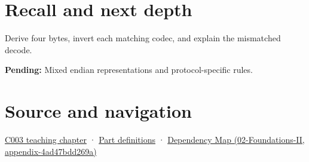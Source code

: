 \section{Recall and next depth}\label{appendix-bc07c3d25b18-recall-and-next-depth}

Derive four bytes, invert each matching codec, and explain the mismatched decode.

\textbf{Pending:} Mixed endian representations and protocol-specific rules.

\section{Source and navigation}\label{appendix-bc07c3d25b18-source-and-navigation}

\href{Continuous\%20Notes/Computing\%20Foundations\%20-\%20From\%20Bits\%20to\%20C++\%20and\%20Systems\%20APIs\#Where\%20the\%20bytes\%20live}{C003 teaching chapter} · \hyperref[appendix-fd090d982a15-m003---parts-41-60]{Part definitions} · \href{../02-Foundations-II/main.pdf\#nameddest=appendix-4ad47bdd269a}{Dependency Map (02-Foundations-II, appendix-4ad47bdd269a)}

